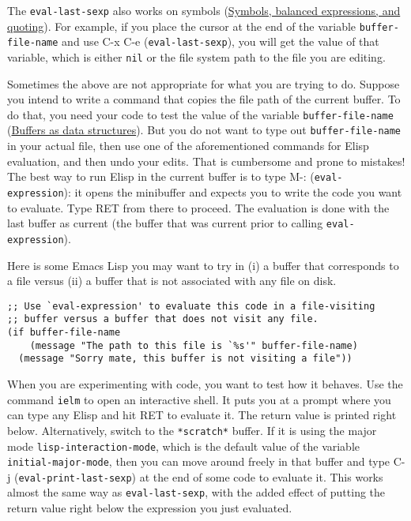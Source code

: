 \documentclass[11pt]{ctexart}
\begin{document}
The \texttt{eval-last-sexp} also works on symbols (\hyperref[sec:org9b7817a]{Symbols, balanced expressions, and quoting}). For example, if you place the cursor at the end of the variable \texttt{buffer-file-name} and use C-x C-e (\texttt{eval-last-sexp}), you will get the value of that variable, which is either \texttt{nil} or the file system path to the file you are editing.

Sometimes the above are not appropriate for what you are trying to do. Suppose you intend to write a command that copies the file path of the current buffer. To do that, you need your code to test the value of the variable \texttt{buffer-file-name} (\hyperref[sec:org426ce04]{Buffers as data structures}). But you do not want to type out \texttt{buffer-file-name} in your actual file, then use one of the aforementioned commands for Elisp evaluation, and then undo your edits. That is cumbersome and prone to mistakes! The best way to run Elisp in the current buffer is to type M-: (\texttt{eval-expression}): it opens the minibuffer and expects you to write the code you want to evaluate. Type RET from there to proceed. The evaluation is done with the last buffer as current (the buffer that was current prior to calling \texttt{eval-expression}).

Here is some Emacs Lisp you may want to try in (i) a buffer that corresponds to a file versus (ii) a buffer that is not associated with any file on disk.

\begin{verbatim}
;; Use `eval-expression' to evaluate this code in a file-visiting
;; buffer versus a buffer that does not visit any file.
(if buffer-file-name
    (message "The path to this file is `%s'" buffer-file-name)
  (message "Sorry mate, this buffer is not visiting a file"))
\end{verbatim}

When you are experimenting with code, you want to test how it behaves. Use the command \texttt{ielm} to open an interactive shell. It puts you at a prompt where you can type any Elisp and hit RET to evaluate it. The return value is printed right below. Alternatively, switch to the \texttt{*scratch*} buffer. If it is using the major mode \texttt{lisp-interaction-mode}, which is the default value of the variable \texttt{initial-major-mode}, then you can move around freely in that buffer and type C-j (\texttt{eval-print-last-sexp}) at the end of some code to evaluate it. This works almost the same way as \texttt{eval-last-sexp}, with the added effect of putting the return value right below the expression you just evaluated.
\end{document}
